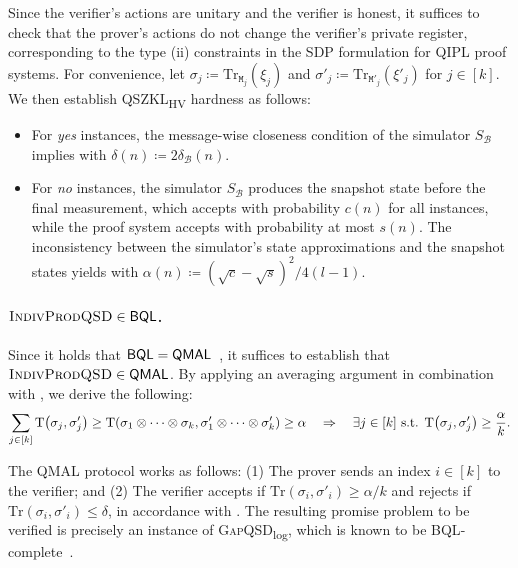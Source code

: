 \documentclass[10pt,a4paper]{article}
\numberwithin{equation}{section}
\numberwithin{figure}{section}
\newcommand{\QIPL}{\textnormal{\textsf{QIPL}}\xspace}
\newcommand{\QMAL}{\textnormal{\textsf{QMAL}}\xspace}
\newcommand{\QSZKLHV}{\texorpdfstring{\textnormal{\textsf{QSZKL}\textsubscript{\textnormal{HV}}}}\xspace}
\newcommand{\BQL}{\textnormal{\textsf{BQL}}\xspace}
\newcommand{\GapQSDlog}{\texorpdfstring{\textnormal{\textsc{GapQSD}\textsubscript{log}}}\xspace}
\newcommand{\IndivProdQSD}{\textnormal{\textsc{IndivProdQSD}}\xspace}
\DeclarePairedDelimiter\rbra{\lparen}{\rparen}
\newcommand{\Tr}{\mathrm{Tr}}
\newcommand{\td}{\mathrm{T}}
\newcommand{\calB}{\mathcal{B}}
\newcommand{\ttM}{\mathtt{M}}
\begin{document}
Since the verifier's actions are unitary and the verifier is honest, it suffices to check that the prover's actions do not change the verifier's private register, corresponding to the type (ii) constraints  in the SDP formulation for \QIPL{} proof systems. For convenience, let $\sigma_j \coloneq \Tr_{\ttM_j}(\xi_j)$ and $\sigma'_j \coloneq \Tr_{\ttM'_j}(\xi'_j)$ for $j\in[k]$. 
We then establish \QSZKLHV{} hardness as follows: 
\begin{itemize}[itemsep=0.33em, topsep=0.33em, parsep=0.33em]
    \item For \textit{yes} instances, the message-wise closeness condition of the simulator $S_{\calB}$ implies  with $\delta(n) \coloneqq 2\delta_{\calB}(n)$. 
    \item For \textit{no} instances, the simulator $S_{\calB}$ produces the snapshot state before the final measurement, which accepts with probability $c(n)$ for all instances, while the proof system accepts with probability at most $s(n)$. The inconsistency between the simulator's state approximations and the snapshot states yields  with $\alpha(n) \coloneqq (\sqrt{c}-\sqrt{s})^2/4(l-1)$.  
\end{itemize}

\paragraph{$\IndivProdQSD{} \in \BQL$.} Since it holds that  $\BQL=\QMAL$~\cite{FKLMN16,FR21}, it suffices to establish that $\IndivProdQSD{} \in \QMAL$. By applying an averaging argument in combination with , we derive the following: 
\begin{equation}
    \label{eq:intro-indiv-far}
    \sum_{j\in[k]} \td\rbra*{\sigma_j,\sigma'_j} \geq \td\rbra*{\sigma_1 \otimes \cdots \otimes \sigma_k, \sigma'_1 \otimes \cdots \otimes \sigma'_k} \geq \alpha 
    \quad \Rightarrow \quad 
    \exists j\in[k] \text{ s.t. } \td\rbra*{\sigma_j,\sigma'_j} \geq \frac{\alpha}{k}. 
\end{equation}

The \QMAL{} protocol works as follows: (1) The prover sends an index $i\in[k]$ to the verifier; and (2) The verifier accepts if $\Tr(\sigma_i,\sigma'_i) \geq \alpha/k$ and rejects if $\Tr(\sigma_i,\sigma'_i) \leq \delta$, in accordance with . The resulting promise problem to be verified is precisely an instance of \GapQSDlog{}, which is known to be \BQL{}-complete~\cite{LGLW23}. 
\end{document}
